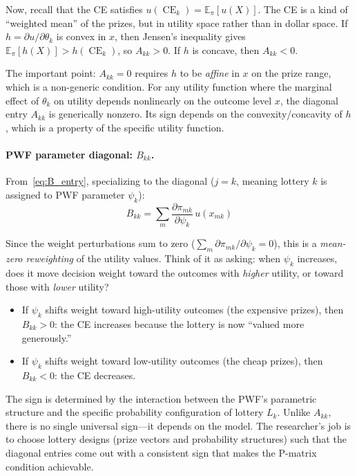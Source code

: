 \documentclass[11pt,a4paper]{article}
\theoremstyle{definition}
\newcommand{\E}{\mathbb{E}}
\DeclareMathOperator{\CE}{CE}
\begin{document}
Now, recall that the CE satisfies $u(\CE_k) = \E_\pi[u(X)]$. The CE is a
kind of ``weighted mean'' of the prizes, but in utility space rather than in
dollar space. If $h = \partial u / \partial \theta_k$ is convex in $x$, then
Jensen's inequality gives $\E_\pi[h(X)] > h(\CE_k)$, so $A_{kk} > 0$.
If $h$ is concave, then $A_{kk} < 0$.

The important point: $A_{kk} = 0$ requires $h$ to be \emph{affine} in $x$
on the prize range, which is a non-generic condition. For any utility
function where the marginal effect of $\theta_k$ on utility depends
nonlinearly on the outcome level $x$, the diagonal entry $A_{kk}$ is
generically nonzero. Its sign depends on the convexity/concavity of $h$, which
is a property of the specific utility function.

\paragraph{PWF parameter diagonal: $B_{kk}$.}
From~\eqref{eq:B_entry}, specializing to the diagonal ($j = k$, meaning
lottery $k$ is assigned to PWF parameter $\psi_k$):
\begin{equation}
    B_{kk} = \sum_{m} \frac{\partial \pi_{mk}}{\partial \psi_k} \,
    u(x_{mk})
\end{equation}

Since the weight perturbations sum to zero
($\sum_m \partial\pi_{mk}/\partial\psi_k = 0$), this is a \emph{mean-zero
reweighting} of the utility values. Think of it as asking: when $\psi_k$
increases, does it move decision weight toward the outcomes with
\emph{higher} utility, or toward those with \emph{lower} utility?

\begin{itemize}
    \item If $\psi_k$ shifts weight toward high-utility outcomes (the
    expensive prizes), then $B_{kk} > 0$: the CE increases because the
    lottery is now ``valued more generously.''

    \item If $\psi_k$ shifts weight toward low-utility outcomes (the cheap
    prizes), then $B_{kk} < 0$: the CE decreases.
\end{itemize}

The sign is determined by the interaction between the PWF's parametric
structure and the specific probability configuration of lottery $L_k$. Unlike
$A_{kk}$, there is no single universal sign---it depends on the model. The
researcher's job is to choose lottery designs (prize vectors and probability
structures) such that the diagonal entries come out with a consistent sign
that makes the P-matrix condition achievable.
\end{document}
